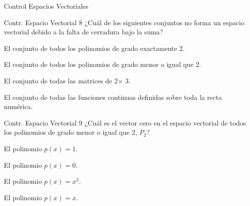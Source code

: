 \documentclass[a4,11pt]{aleph-notas}
\begin{document}
\begin{quiz}{Control Espacios Vectoriales}
\begin{multi}{Contr. Espacio Vectorial 8}%
    {¿Cuál de los siguientes conjuntos no forma un espacio vectorial debido a la falta de cerradura bajo la suma?}
    \item* El conjunto de todos los polinomios de grado exactamente 2.
    \item El conjunto de todos los polinomios de grado menor o igual que 2.
    \item El conjunto de todas las matrices de 2$\times$ 3.
    \item El conjunto de todas las funciones continuas definidas sobre toda la recta numérica.
\end{multi}

\begin{multi}{Contr. Espacio Vectorial 9}%
    {¿Cuál es el vector cero en el espacio vectorial de todos los polinomios de grado menor o igual que 2, \(P_2\)?}
    \item El polinomio \(p(x) = 1\).
    \item* El polinomio \(p(x) = 0\).
    \item El polinomio \(p(x) = x^2\).
    \item El polinomio \(p(x) = x\).
\end{multi}


\end{quiz}
\end{document}
